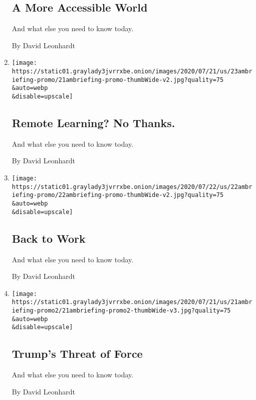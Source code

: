 \begin{enumerate}
  \hypertarget{a-more-accessible-world}{%
  \subsection{A More Accessible World}\label{a-more-accessible-world}}

  And what else you need to know today.

  By David Leonhardt
\item
  \href{/2020/07/23/briefing/home-schooling-coronavirus-portland-your-thursday-briefing.html}{}

  \texttt{[image: https://static01.graylady3jvrrxbe.onion/images/2020/07/21/us/23ambriefing-promo/21ambriefing-promo-thumbWide-v2.jpg?quality=75\\\&auto=webp\\\&disable=upscale]}

  \hypertarget{remote-learning-no-thanks}{%
  \subsection{Remote Learning? No
  Thanks.}\label{remote-learning-no-thanks}}

  And what else you need to know today.

  By David Leonhardt
\item
  \href{/2020/07/22/briefing/paycheck-protection-program-houston-chicago-your-wednesday-briefing.html}{}

  \texttt{[image: https://static01.graylady3jvrrxbe.onion/images/2020/07/22/us/22ambriefing-promo/22ambriefing-promo-thumbWide-v2.jpg?quality=75\\\&auto=webp\\\&disable=upscale]}

  \hypertarget{back-to-work}{%
  \subsection{Back to Work}\label{back-to-work}}

  And what else you need to know today.

  By David Leonhardt
\item
  \href{/2020/07/21/briefing/chicago-coronavirus-joe-biden-your-tuesday-briefing.html}{}

  \texttt{[image: https://static01.graylady3jvrrxbe.onion/images/2020/07/21/us/21ambriefing-promo2/21ambriefing-promo2-thumbWide-v3.jpg?quality=75\\\&auto=webp\\\&disable=upscale]}

  \hypertarget{trumps-threat-of-force}{%
  \subsection{Trump's Threat of Force}\label{trumps-threat-of-force}}

  And what else you need to know today.

  By David Leonhardt
\end{enumerate}

